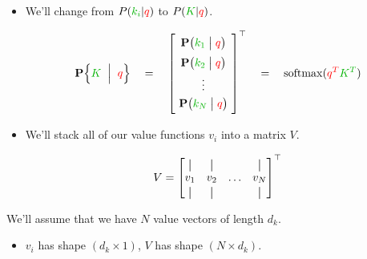         \begin{itemize}
            \item We'll change from $P(\grn{k_i}|\red{q})$ to $P(\grn{K}|\red{q})$.
        

            \begin{equation*}
                \given{ \grn{K} }{ \red{q} }  \quad=\quad
                \begin{bmatrix}
                    \phantom{\Big|} 
                    \mathbf{P} \big( \grn{k_1} \;\big|\; \red{q} \big) \phantom{\Big|} \\
                    \phantom{\Big|}
                    \mathbf{P} \big( \grn{k_2} \;\big|\; \red{q} \big) 
                    \phantom{\Big|}\\
                    \vdots \\
                    \phantom{\Big|}
                    \mathbf{P} \big( \grn{k_N} \;\big|\; \red{q} \big) 
                    \phantom{\Big|}\\
                \end{bmatrix}^\top
                \quad=\quad
                \operatorname{softmax}( \red{q^T}\grn{K^T})
            \end{equation*}

            \item We'll stack all of our value functions $v_i$ into a matrix $V$.

            \begin{equation}
                V = 
                \begin{bmatrix}
                    \vertbar & \vertbar  & \     & \vertbar \\
                    v_1 & v_2 & \ldots & v_N \\
                    \vertbar & \vertbar  &        & \vertbar
                \end{bmatrix}^\top
            \end{equation}
        \end{itemize}

        \begin{notation}
            We'll assume that we have $N$ value vectors of length $d_k$.

            \begin{itemize}
                \item $v_i$ has shape $(d_k \times 1)$, $V$ has shape $(N\times d_k )$.
            \end{itemize}
        \end{notation}

